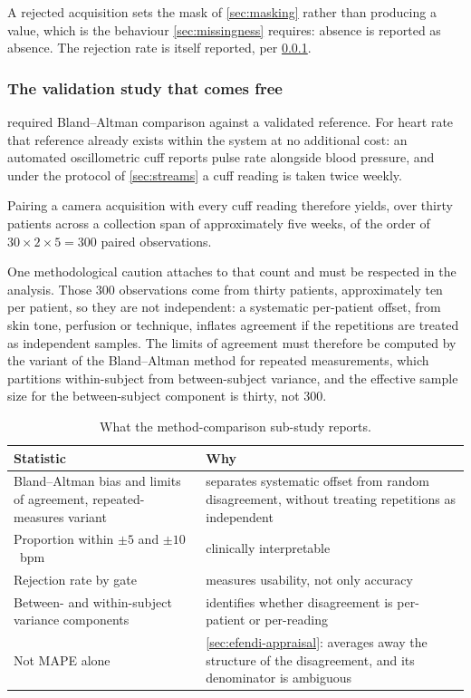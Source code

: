 \documentclass[12pt,a4paper,oneside]{report}
\begin{document}
A rejected acquisition sets the mask of \cref{sec:masking} rather than producing a value, which is the behaviour \cref{sec:missingness} requires: absence is reported as absence. The rejection rate is itself reported, per \cref{sec:ppg-validation}.

\subsubsection{The validation study that comes free}\label{sec:ppg-validation}

 required Bland--Altman comparison against a validated reference. For heart rate that reference already exists within the system at no additional cost: an automated oscillometric cuff reports pulse rate alongside blood pressure, and under the protocol of \cref{sec:streams} a cuff reading is taken twice weekly.

Pairing a camera acquisition with every cuff reading therefore yields, over thirty patients across a collection span of approximately five weeks, of the order of $30 \times 2 \times 5 = 300$ paired observations.

One methodological caution attaches to that count and must be respected in the analysis. Those 300 observations come from thirty patients, approximately ten per patient, so they are not independent: a systematic per-patient offset, from skin tone, perfusion or technique, inflates agreement if the repetitions are treated as independent samples. The limits of agreement must therefore be computed by the variant of the Bland--Altman method for repeated measurements, which partitions within-subject from between-subject variance, and the effective sample size for the between-subject component is thirty, not 300.

\begin{table}[htbp]
\centering\small
\caption{What the method-comparison sub-study reports.}\label{tab:ppg-reporting}
\begin{tabularx}{\textwidth}{@{}>{\raggedright\arraybackslash}p{6.0cm} X@{}}
\toprule
\textbf{Statistic} & \textbf{Why} \\
\midrule
Bland--Altman bias and limits of agreement, repeated-measures variant & separates systematic offset from random disagreement, without treating repetitions as independent \\
Proportion within $\pm5$ and $\pm10$~bpm & clinically interpretable \\
Rejection rate by gate & measures usability, not only accuracy \\
Between- and within-subject variance components & identifies whether disagreement is per-patient or per-reading \\
Not MAPE alone & \cref{sec:efendi-appraisal}: averages away the structure of the disagreement, and its denominator is ambiguous \\
\bottomrule
\end{tabularx}
\end{table}
\end{document}
